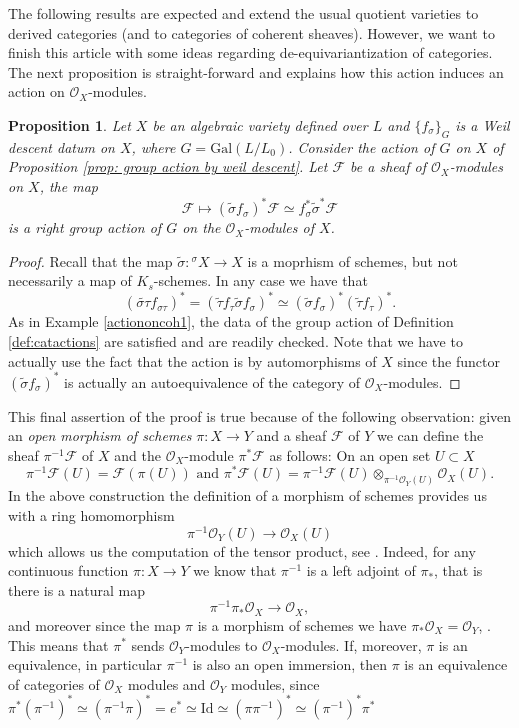 \documentclass[10pt]{amsart}
\newtheorem{proposition}[theorem]{Proposition}
\theoremstyle{definition}
\renewcommand{\O}{{\mathcal{O}}}
\newcommand{\Gal}{{ \mathrm{Gal}}}
\begin{document}
The following results are expected and extend the usual quotient varieties to derived categories (and to categories of coherent sheaves). However, we want to finish this article with some ideas regarding de-equivariantization of categories. The next proposition is straight-forward and explains how this action induces an action on $\O_X$-modules.

\begin{proposition}
\label{prop:9}
Let $X$ be an algebraic variety defined over $L$ and $\{f_{\sigma} \}_G$ is a Weil descent datum on $X$, where $G = \Gal(L/L_0)$. Consider the action of $G$ on $X$ of Proposition \ref{prop: group action by weil descent}.  Let $\mathcal{F}$ be a sheaf of $\mathcal{O}_X$-modules on $X$, 
  the map 
  \[
\mathcal{F} \mapsto  
 (\tilde{\sigma } f_\sigma )^*
 \mathcal{F}
 \simeq f_\sigma ^*  \tilde{\sigma}^*  \mathcal{F}
\]
 is a right group  action of $G$ on the $\mathcal{O}_X$-modules of $X$. 
\end{proposition}
\begin{proof}
  Recall that the map $\tilde{\sigma}\colon {^\sigma \! X }\rightarrow X  $ is a moprhism of schemes, but not necessarily a map of $K_s$-schemes. 
  In any case we have that 
  \[
    (\widetilde{\sigma\tau } f_{\sigma\tau} )^*
    =
    (\tilde{\tau } f_\tau  \tilde{\sigma } f_\sigma )^* \simeq
    (\tilde{\sigma } f_\sigma )^* (\tilde{\tau } f_\tau )^*.
    \] 
As in Example \ref{actiononcoh1}, the data of the group action of Definition \ref{def:catactions} are satisfied and are readily checked. Note that we have to actually use the fact that the action is by automorphisms of $X$ since the functor $(\tilde{\sigma}f_\sigma)^*$ is actually an autoequivalence of the category of $\O_X$-modules. 
\end{proof}
This final assertion of the proof is true because of the following observation:
given an {\em open morphism of schemes} $\pi \colon X\rightarrow Y$ and a sheaf $\mathcal{F}$ of $Y$ we can define the sheaf $\pi^{-1}\mathcal{F}$ of $X$ and the $\mathcal{O}_X$-module $\pi^* \mathcal{F}$ as follows:
On an open set $U \subset X$ 
\[
  \pi^{-1} \mathcal{F}(U)= \mathcal{F}(\pi(U))
  \text{ and }
  \pi^{\ast} \mathcal{F}(U) 
  = \pi^{-1} \mathcal{F}(U) \otimes_{\pi^{-1}\mathcal{O}_Y(U)} \mathcal{O}_X(U). 
\] 
In the above construction the definition of a morphism of schemes provides us with a ring homomorphism 
\[
  \pi^{-1}\mathcal{O}_Y(U) \rightarrow \mathcal{O}_X(U)
\]
which allows us the computation of the tensor product, see \cite[II.5]{Hartshorne:77}. Indeed, for any continuous function $\pi\colon X \rightarrow  Y$ we know that $\pi^{-1}$ is a left adjoint of $\pi_{\ast}$, that is there is a natural map 
\[
  \pi^{-1} \pi_{\ast} \mathcal{O}_X \rightarrow \mathcal{O}_X,
\]
and moreover since the map $\pi$ is a morphism of schemes we have $\pi_{\ast} \mathcal{O}_X= \mathcal{O}_Y$, \cite[Exer. II.1.18]{Hartshorne:77}.
This means that $\pi^*$ sends $\O_Y$-modules to $\O_X$-modules. If, moreover, $\pi$ is an equivalence, in particular $\pi^{-1}$ is also an open immersion, then $\pi$ is an equivalence of categories of $\O_X$ modules and $\O_Y$ modules, since $\pi^* (\pi^{-1})^* \simeq (\pi^{-1}\pi)^* = e^* \simeq \mathrm{Id} \simeq (\pi\pi^{-1})^* \simeq  (\pi^{-1})^* \pi^* $
\end{document}
